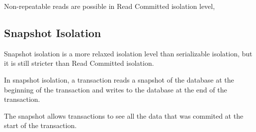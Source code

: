 Non-repeatable reads are possible in Read Committed isolation level, 



\subsection{Snapshot Isolation}
Snapshot isolation is a more relaxed isolation level than serializable isolation, but it is still stricter than Read Committed isolation.

In snapshot isolation, a transaction reads a snapshot of the database at the beginning of the transaction and writes to the database at the end of the transaction.

The snapshot allows transactions to see all the data that was commited at the start of the transaction.